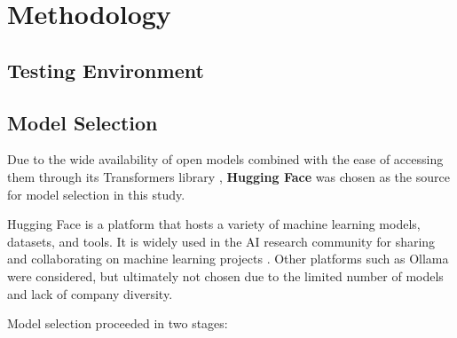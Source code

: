 \section{Methodology}

\subsection{Testing Environment}

\subsection{Model Selection}

Due to the wide availability of open models combined with the ease of accessing them through its Transformers library \cite{Wolf2019}, \textbf{Hugging Face} was chosen as the source for model selection in this study.

Hugging Face is a platform that hosts a variety of machine learning models, datasets, and tools. It is widely used in the AI research community for sharing and collaborating on machine learning projects \cite{HuggingFaceResearchGate, HuggingFaceMain}. Other platforms such as Ollama \cite{Ollama} were considered, but ultimately not chosen due to the limited number of models and lack of company diversity. 

Model selection proceeded in two stages:

